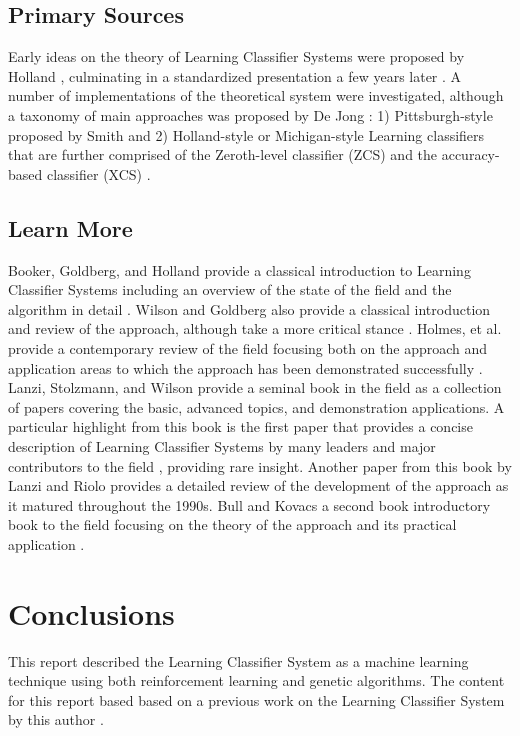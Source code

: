 \documentclass[a4paper, 11pt]{article}
\begin{document}
% 
% 
\subsection{Primary Sources}
Early ideas on the theory of Learning Classifier Systems were proposed by Holland \cite{Holland1976, Holland1977}, culminating in a standardized presentation a few years later \cite{Holland1980}.
A number of implementations of the theoretical system were investigated, although a taxonomy of main approaches was proposed by De Jong \cite{Jong1988}: 1) Pittsburgh-style proposed by Smith \cite{Smith1980, Smith1983} and 2) Holland-style or Michigan-style Learning classifiers that are further comprised of the Zeroth-level classifier (ZCS) \cite{Wilson1994} and the accuracy-based classifier (XCS) \cite{Wilson1995}.

% 
% 
\subsection{Learn More}
Booker, Goldberg, and Holland provide a classical introduction to Learning Classifier Systems including an overview of the state of the field and the algorithm in detail \cite{Booker1989}. Wilson and Goldberg also provide a classical introduction and review of the approach, although take a more critical stance \cite{Wilson1989}.
Holmes, et al. provide a contemporary review of the field focusing both on the approach and application areas to which the approach has been demonstrated successfully \cite{Holmes2002}.
Lanzi, Stolzmann, and Wilson provide a seminal book in the field as a collection of papers covering the basic, advanced topics, and demonstration applications. A particular highlight from this book is the first paper that provides a concise description of Learning Classifier Systems by many leaders and major contributors to the field \cite{Holland2000}, providing rare insight. Another paper from this book by Lanzi and Riolo provides a detailed review of the development of the approach as it matured throughout the 1990s.
Bull and Kovacs a second book introductory book to the field focusing on the theory of the approach and its practical application \cite{Bull2005}.

% 
% 
\section{Conclusions}
\label{sec:conclusions}
This report described the Learning Classifier System as a machine learning technique using both reinforcement learning and genetic algorithms. The content for this report based based on a previous work on the Learning Classifier System by this author \cite{Brownlee2007a}.
\end{document}
